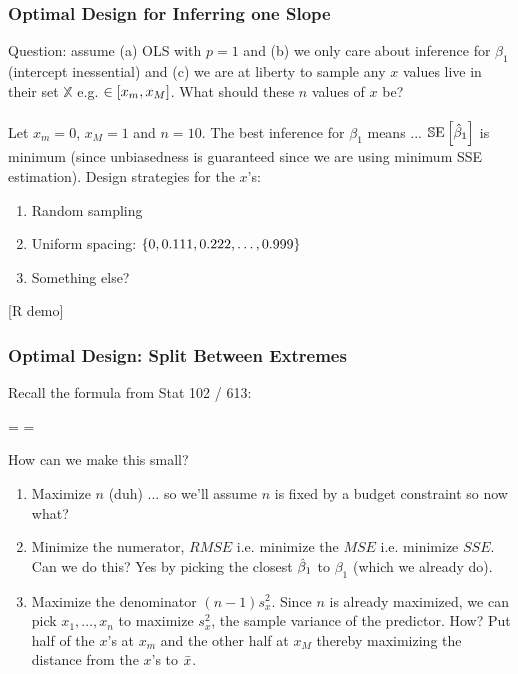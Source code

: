 \documentclass[handout]{beamer}
\begin{document}
\begin{frame}\frametitle{Optimal Design for Inferring one Slope}

Question: assume (a) OLS with $p=1$ and \pause (b) we only care about inference for $\beta_1$ (intercept inessential) and \pause (c) we are at liberty to sample any $x$ values live in their set $\mathbb{X}$ e.g. $\in \left[x_m, x_M\right]$. What should these $n$ values of $x$ be? \\~\\

Let $x_m = 0$, $x_M = 1$ and $n = 10$. The best inference for $\beta_1$ means ... \pause $\mathbb{S}\text{E}\left[\hat{\beta}_1\right]$ is minimum (since unbiasedness is guaranteed since we are using minimum SSE estimation). Design strategies for the $x$'s: \pause

\begin{enumerate}
\item Random sampling \pause
\item Uniform spacing: $\left\{0, 0.111, 0.222, \ldots, 0.999\right\}$ \pause
\item Something else?
\end{enumerate}

[R demo]

\end{frame}


\begin{frame}\frametitle{Optimal Design: Split Between Extremes}

Recall the formula from Stat 102 / 613:

\beqn
{} =  = 
\eeqn

How can we make this small? \pause 

\begin{enumerate}
\item Maximize $n$ (duh) ... so we'll assume $n$ is fixed by a budget constraint so now what? \pause
\item Minimize the numerator, $RMSE$ i.e. minimize the $MSE$ i.e. minimize $SSE$. Can we do this? \pause Yes by picking the closest $\hat{\beta}_1$ to $\beta_1$ (which we already do). \pause
\item Maximize the denominator $(n-1) s^2_x$. Since $n$ is already maximized, we can pick $x_1, \ldots, x_n$ to maximize $s^2_x$, the sample variance of the predictor.  How? \pause Put half of the $x$'s at $x_m$ and the other half at $x_M$ thereby \pause maximizing the distance from the $x$'s to \pause $\bar{x}$.
\end{enumerate}
	
\end{frame}
\end{document}

